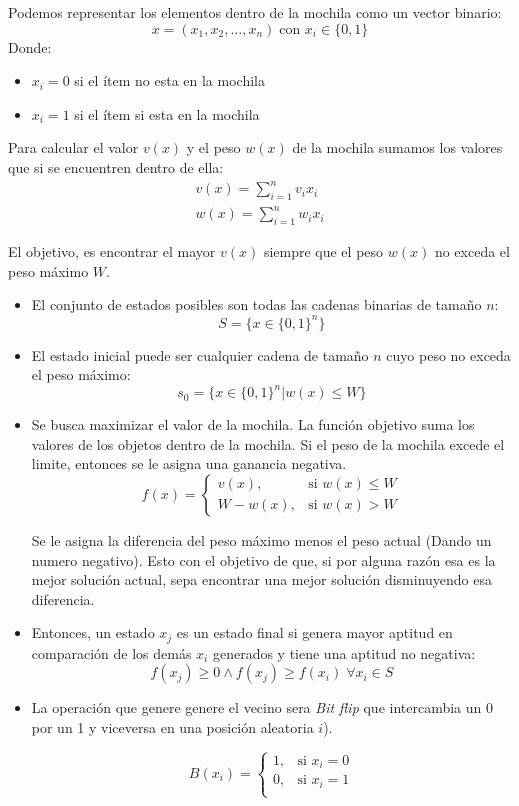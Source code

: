\documentclass[12pt,twoside]{article}
\begin{document}
	Podemos representar los elementos dentro de la mochila como un vector binario: 
	\[ x = (x_1, x_2, \dots , x_n) \; \text{con } x_i \in \{0, 1\} \]
	Donde:
	\begin{itemize}
		\item $x_i = 0$ si el ítem no esta en la mochila
		\item $x_i = 1$ si el ítem si esta en la mochila
	\end{itemize}
	
	Para calcular el valor $v(x)$ y el peso $w(x)$ de la mochila sumamos los valores que si se encuentren dentro de ella:
	\begin{gather*}
		v(x) = \sum_{i = 1}^{n} v_i x_i \\
		w(x) = \sum_{i = 1}^{n} w_i x_i 
	\end{gather*}
	
	El objetivo, es encontrar el mayor $v(x)$ siempre que el peso $w(x)$ no exceda el peso máximo $W$. 
	
	\begin{itemize}
		\item El conjunto de estados posibles son todas las cadenas binarias de tamaño $n$: \[ S = \{ x \in \{ 0, 1  \}^n \} \]
		
		\item El estado inicial puede ser cualquier cadena de tamaño $n$ cuyo peso no exceda el peso máximo: \[ s_0 = \{x \in \{0,1\}^n | w(x) \leq W \} \]
		
		\item Se busca maximizar el valor de la mochila. La función objetivo suma los valores de los objetos dentro de la mochila. Si el peso de la mochila excede el limite, entonces se le asigna una ganancia negativa. 
		\[
		f(x) =
		\begin{cases} 
			v(x), & \text{si } w(x) \leq W \\ 
			W - w(x), & \text{si } w(x) > W
		\end{cases}
		\]
		
		Se le asigna la diferencia del peso máximo menos el peso actual (Dando un numero negativo). Esto con el objetivo de que, si por alguna razón esa es la mejor solución actual, sepa encontrar una mejor solución disminuyendo esa diferencia.
		
		\item Entonces, un estado $x_j$ es un estado final si genera mayor aptitud en comparación de los demás $x_i$ generados y tiene una aptitud no negativa: \[ f(x_j) \geq 0 \land f(x_j) \geq f(x_i) \; \forall x_i \in S\]
		
		\item La operación que genere genere el vecino sera \textit{Bit flip} que intercambia un 0 por un 1 y viceversa en una posición aleatoria $i$).
		
		\[
		B(x_i) =
		\begin{cases} 
			1, & \text{si } x_i = 0 \\ 
			0, & \text{si } x_i = 1 \\
		\end{cases}
		\]
		
		
	\end{itemize}
	
\end{document}
